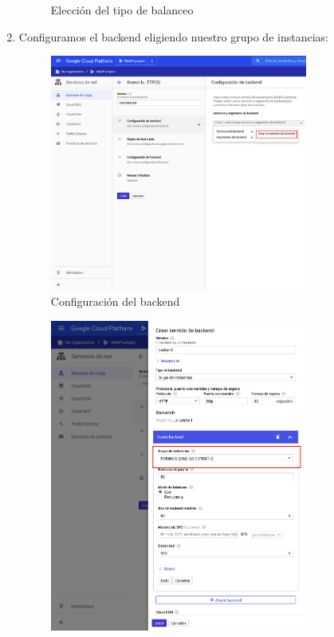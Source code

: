 \documentclass[12pt,spanish]{article}
\begin{document}
\begin{enumerate}
\begin{figure}[H]
		\caption{Elección del tipo de balanceo}
	\end{figure}
	\item Configuramos el backend eligiendo nuestro grupo de instancias:
	\begin{figure}[H]
		\centering
		\includegraphics[width=0.8\textwidth]{project/backend.png}
		\caption{Configuración del backend}
	\end{figure}
	\begin{figure}[H]
		\centering
		\includegraphics[width=0.8\textwidth]{project/backend_selection.png}

\end{figure}
\end{enumerate}
\end{document}
